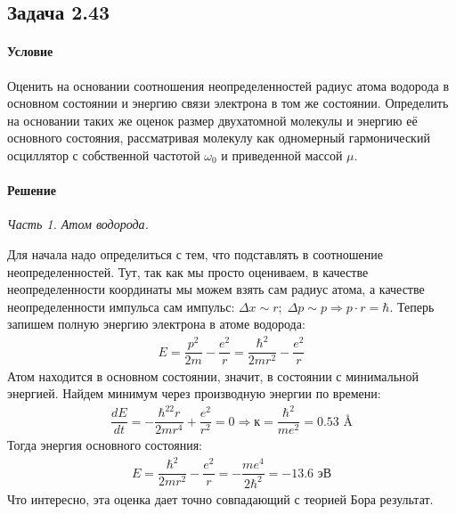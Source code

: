 \documentclass[12pt]{article}
\begin{document}
\subsection{Задача 2.43}
\label{task_2.43}
\paragraph{Условие} Оценить на основании соотношения неопределенностей радиус атома водорода в основном состоянии и энергию связи электрона в том же состоянии. Определить на основании таких же оценок размер двухатомной молекулы и энергию её основного состояния, рассматривая молекулу как одномерный гармонический осциллятор с собственной частотой $\omega_0$ и приведенной массой $\mu$.
\paragraph{Решение}
\textit{Часть 1. Атом водорода.}

Для начала надо определиться с тем, что подставлять в соотношение неопределенностей. Тут, так как мы просто оцениваем, в качестве неопределенности координаты мы можем взять сам радиус атома, а качестве неопределенности импульса сам импульс: $\Delta x \sim r; \; \Delta p \sim p \Rightarrow p\cdot r = \hbar $. Теперь запишем полную энергию электрона в атоме водорода:
\begin{gather*}
    E = \dfrac{p^2}{2m} - \dfrac{e^2}{r} = \dfrac{\hbar^2}{2mr^2} - \dfrac{e^2}{r}
\end{gather*}
Атом находится в основном состоянии, значит, в состоянии с минимальной энергией. Найдем минимум через производную энергии по времени:
\begin{gather*}
    \dfrac{dE}{dt} = -\dfrac{\hbar^22r}{2mr^4} + \dfrac{e^2}{r^2} = 0 \Rightarrow к = \dfrac{\hbar^2}{me^2}=0.53 \text{ \AA}
\end{gather*}
Тогда энергия основного состояния:
\begin{gather*}
     E = \dfrac{\hbar^2}{2mr^2} - \dfrac{e^2}{r} = -\dfrac{me^4}{2\hbar^2} = -13.6\text{ эВ}
\end{gather*}
Что интересно, эта оценка дает точно совпадающий с теорией Бора результат.
\end{document}
